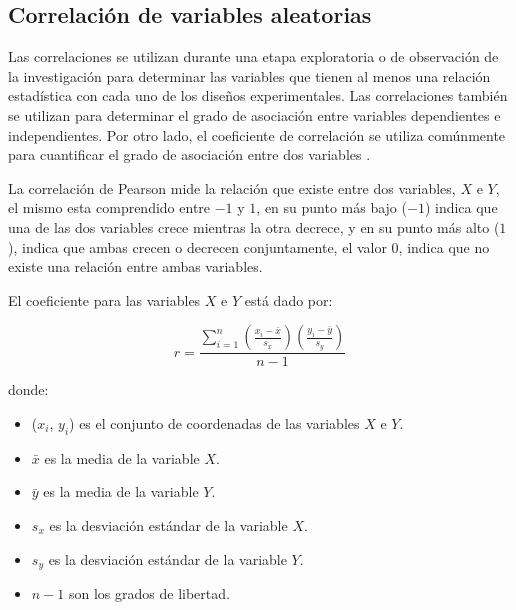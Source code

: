 %

\subsection{Correlación de variables aleatorias}
\label{sec:def_correlacion}

Las correlaciones se utilizan durante una etapa exploratoria o de observación de
la investigación para determinar las variables que tienen al menos una relación
estadística con cada uno de los diseños experimentales. Las correlaciones
también se utilizan para determinar el grado de asociación entre variables
dependientes e independientes. Por otro lado, el coeficiente de correlación se
utiliza comúnmente para cuantificar el grado de asociación entre dos variables
\cite{BoslaughStatistics2008}.

La correlación de Pearson\cite{BoslaughStatistics2008} mide la relación que
existe entre dos variables, $X$ e $Y$, el mismo esta comprendido entre $-1$ y
$1$, en su punto más bajo ($-1$) indica que una de las dos variables crece
mientras la otra decrece, y en su punto más alto ($1$), indica que ambas crecen
o decrecen conjuntamente, el valor $0$, indica que no existe una relación entre
ambas variables.

El coeficiente para las variables $X$ e $Y$ está dado por:

\begin{equation}
r = \frac{\sum_{i=1}^n{(\frac{x_i-\bar{x}}{s_x})({\frac{y_i-\bar{y}}{s_y}})}}%
{n - 1}
\end{equation}

donde:

\begin{itemize}
    \item ($x_i$, $y_i$) es el conjunto de coordenadas de las variables $X$ e $Y$.
    \item $\bar{x}$ es la media de la variable $X$.
    \item $\bar{y}$ es la media de la variable $Y$.
    \item $s_x$ es la desviación estándar de la variable $X$.
    \item $s_y$ es la desviación estándar de la variable $Y$.
    \item $n - 1$ son los grados de libertad.
\end{itemize}
